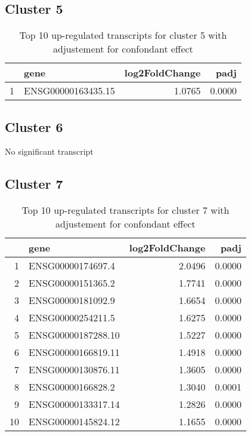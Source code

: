 \documentclass{article}
\begin{document}
\subsection{Cluster 5 }
\begin{table}[H]
\centering
\begin{tabular}{rlrr}
  \hline
 & gene & log2FoldChange & padj \\ 
  \hline
1 & ENSG00000163435.15 & 1.0765 & 0.0000 \\ 
   \hline
\end{tabular}
\caption{Top 10 up-regulated transcripts for cluster 5 with adjustement for confondant effect} 
\label{tab:q3_1_conf_5}
\end{table}
\subsection{Cluster 6 }
No significant transcript
\subsection{Cluster 7 }
\begin{table}[H]
\centering
\begin{tabular}{rlrr}
  \hline
 & gene & log2FoldChange & padj \\ 
  \hline
1 & ENSG00000174697.4 & 2.0496 & 0.0000 \\ 
  2 & ENSG00000151365.2 & 1.7741 & 0.0000 \\ 
  3 & ENSG00000181092.9 & 1.6654 & 0.0000 \\ 
  4 & ENSG00000254211.5 & 1.6275 & 0.0000 \\ 
  5 & ENSG00000187288.10 & 1.5227 & 0.0000 \\ 
  6 & ENSG00000166819.11 & 1.4918 & 0.0000 \\ 
  7 & ENSG00000130876.11 & 1.3605 & 0.0000 \\ 
  8 & ENSG00000166828.2 & 1.3040 & 0.0001 \\ 
  9 & ENSG00000133317.14 & 1.2826 & 0.0000 \\ 
  10 & ENSG00000145824.12 & 1.1655 & 0.0000 \\ 
   \hline
\end{tabular}
\caption{Top 10 up-regulated transcripts for cluster 7 with adjustement for confondant effect} 
\label{tab:q3_1_conf_7}
\end{table}
\end{document}
